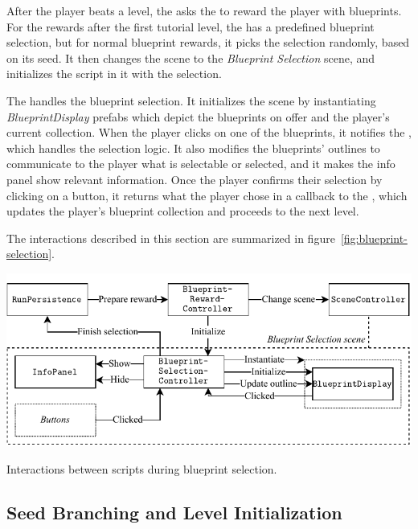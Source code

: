 After the player beats a level, the  asks the  to reward the player with blueprints.
For the rewards after the first tutorial level, the  has a predefined blueprint selection, but for normal blueprint rewards, it picks the selection randomly, based on its seed.
It then changes the scene to the \emph{Blueprint Selection} scene, and initializes the  script in it with the selection.

The  handles the blueprint selection.
It initializes the scene by instantiating \emph{BlueprintDisplay} prefabs which depict the blueprints on offer and the player's current collection.
When the player clicks on one of the blueprints, it notifies the , which handles the selection logic.
It also modifies the blueprints' outlines to communicate to the player what is selectable or selected, and it makes the info panel show relevant information.
Once the player confirms their selection by clicking on a button, it returns what the player chose in a callback to the , which updates the player's blueprint collection and proceeds to the next level.

The interactions described in this section are summarized in figure~\ref{fig:blueprint-selection}.
\begin{center}
    \captionsetup{type=figure}
    \includegraphics[width=\textwidth]{img/blueprint selection.pdf}
    \caption{Interactions between scripts during blueprint selection.}
    \label{fig:blueprint-selection}
\end{center}

\subsection{Seed Branching and Level Initialization}\label{sec:docs-level-init}

